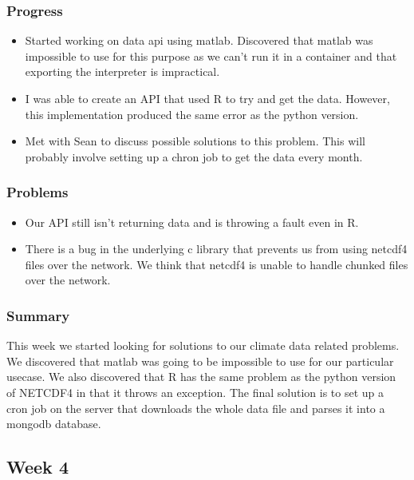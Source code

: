 \documentclass[onecolumn, draftclsnofoot,10pt, compsoc]{article}
\begin{document}
			\subsubsection{Progress}
			    \begin{itemize}
			        \item Started working on data api using matlab. Discovered that matlab was impossible to use for this purpose as we can't run it in a container and that exporting the interpreter is impractical.\\
			        \item I was able to create an API that used R to try and get the data. However, this implementation produced the same error as the python version.\\
			        \item Met with Sean to discuss possible solutions to this problem. This will probably involve setting up a chron job to get the data every month.\\
			    \end{itemize}
			\subsubsection{Problems}
			    \begin{itemize}
			        \item Our API still isn't returning data and is throwing a fault even in R.\\
			        \item There is a bug in the underlying c library that prevents us from using netcdf4 files over the network. We think that netcdf4 is unable to handle chunked files over the network.\\
			    \end{itemize}
			\subsubsection{Summary} This week we started looking for solutions to our climate data related problems. We discovered that matlab was going to be impossible to use for our particular usecase. We also discovered that R has the same problem as the python version of NETCDF4 in that it throws an exception. The final solution is to set up a cron job on the server that downloads the whole data file and parses it into a mongodb database.\\
			
		\subsection{Week 4}
\end{document}
